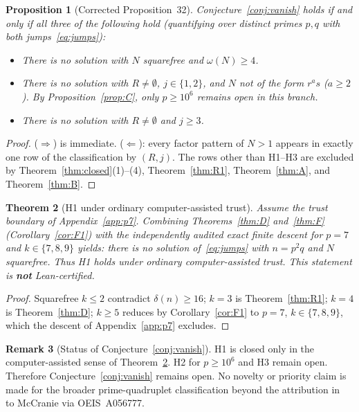 \documentclass[11pt,reqno]{amsart}
\newtheorem{theorem}{Theorem}
\newtheorem{proposition}[theorem]{Proposition}
\theoremstyle{definition}
\newtheorem{remark}[theorem]{Remark}
\begin{document}
\begin{proposition}[Corrected Proposition~32]
\label{prop:implies-corrected}
Conjecture~\ref{conj:vanish} holds if and only if all three of the following hold (quantifying over distinct primes \(p,q\) with both jumps~\eqref{eq:jumps}):
\begin{itemize}
\item[\textbf{H1.}] There is no solution with \(N\) squarefree and \(\omega(N)\ge 4\).
\item[\textbf{H2.}] There is no solution with \(R\neq\emptyset\), \(j\in\{1,2\}\), and \(N\) not of the form \(r^as\) (\(a\ge 2\)). By Proposition~\ref{prop:C}, only \(p\ge 10^6\) remains open in this branch.
\item[\textbf{H3.}] There is no solution with \(R\neq\emptyset\) and \(j\ge 3\).
\end{itemize}
\end{proposition}

\begin{proof}
(\(\Rightarrow\)) is immediate. (\(\Leftarrow\)): every factor pattern of \(N>1\) appears in exactly one row of the classification by \((R,j)\). The rows other than H1--H3 are excluded by Theorem~\ref{thm:closed}(1)--(4), Theorem~\ref{thm:R1}, Theorem~\ref{thm:A}, and Theorem~\ref{thm:B}.
\end{proof}

\begin{theorem}[H1 under ordinary computer-assisted trust]
\label{thm:H1-comp}
Assume the trust boundary of Appendix~\ref{app:p7}. Combining Theorems~\ref{thm:D} and~\ref{thm:F} (Corollary~\ref{cor:F1}) with the independently audited exact finite descent for \(p=7\) and \(k\in\{7,8,9\}\) yields: there is no solution of~\eqref{eq:jumps} with \(n=p^2q\) and \(N\) squarefree. Thus H1 holds under ordinary computer-assisted trust. This statement is \textbf{not} Lean-certified.
\end{theorem}

\begin{proof}
Squarefree \(k\le 2\) contradict \(\delta(n)\ge 16\); \(k=3\) is Theorem~\ref{thm:R1}; \(k=4\) is Theorem~\ref{thm:D}; \(k\ge 5\) reduces by Corollary~\ref{cor:F1} to \(p=7\), \(k\in\{7,8,9\}\), which the descent of Appendix~\ref{app:p7} excludes.
\end{proof}

\begin{remark}[Status of Conjecture~\ref{conj:vanish}]
H1 is closed only in the computer-assisted sense of Theorem~\ref{thm:H1-comp}. H2 for \(p\ge 10^6\) and H3 remain open. Therefore Conjecture~\ref{conj:vanish} remains open. No novelty or priority claim is made for the broader prime-quadruplet classification beyond the attribution in~\cite{RCW2026} to McCranie via OEIS~A056777.
\end{remark}
\end{document}
